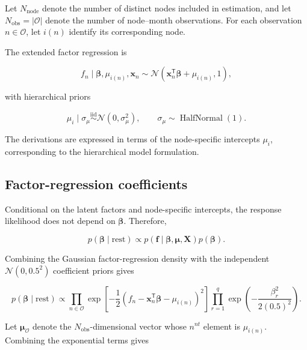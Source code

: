 \documentclass[pdftex,12pt,openright,a4paper,oneside]{book}
\begin{document}
Let $N_{\mathrm{node}}$ denote the number of distinct
nodes included in estimation, and let
$N_{\mathrm{obs}}=|\mathcal{O}|$ denote the number
of node--month observations.
For each observation $n\in\mathcal{O}$,
let $i(n)$ identify its corresponding node.

The extended factor regression is

\begin{equation*}
f_n\mid
\boldsymbol{\beta},\mu_{i(n)},\mathbf{x}_n
\sim
\mathcal{N}
\left(
\mathbf{x}_n^{\mathsf T}\boldsymbol{\beta}
+\mu_{i(n)},1
\right),
\end{equation*}

with hierarchical priors

\begin{equation*}
\mu_i\mid\sigma_\mu
\overset{\mathrm{iid}}{\sim}
\mathcal{N}(0,\sigma_\mu^2),
\qquad
\sigma_\mu\sim\operatorname{HalfNormal}(1).
\end{equation*}

The derivations are expressed in terms of the
node-specific intercepts $\mu_i$, corresponding
to the hierarchical model formulation.

\subsection{Factor-regression coefficients}
\label{app:node_beta_conditional}

Conditional on the latent factors and node-specific
intercepts, the response likelihood does not
depend on $\boldsymbol{\beta}$.
Therefore,

\begin{equation*}
p(\boldsymbol{\beta}\mid\mathrm{rest})
\propto
p(\mathbf{f}\mid
\boldsymbol{\beta},\boldsymbol{\mu},\mathbf{X})
p(\boldsymbol{\beta}).
\end{equation*}

Combining the Gaussian factor-regression density
with the independent
$\mathcal{N}(0,0.5^2)$ coefficient priors gives

\begin{equation*}
p(\boldsymbol{\beta}\mid\mathrm{rest})
\propto 
\prod_{n\in\mathcal{O}}
\exp\left[
-\frac12
\left(
f_n-\mathbf{x}_n^{\mathsf T}
\boldsymbol{\beta}-\mu_{i(n)}
\right)^2
\right]
\prod_{r=1}^{q}
\exp\left(
-\frac{\beta_r^2}{2(0.5)^2}
\right).
\end{equation*}

Let $\boldsymbol{\mu}_{\mathcal{O}}$ denote
the $N_{\mathrm{obs}}$-dimensional vector
whose $n^{nt}$ element is $\mu_{i(n)}$.
Combining the exponential terms gives
\end{document}
